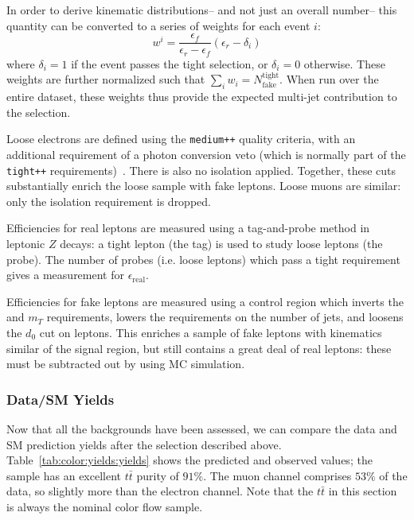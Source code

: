 In order to derive kinematic distributions-- and not just an overall number-- this quantity can be converted to a series of weights for each event $i$:
%
\begin{equation}
w^i = \frac{\epsilon_f}{\epsilon_r - \epsilon_f} (\epsilon_r - \delta_i)
\end{equation}
%
where $\delta_i = 1$ if the event passes the tight selection, or $\delta_i = 0$ otherwise. These weights are further normalized such that $\sum_i w_i = N_\mathrm{fake}^\mathrm{tight}$. When run over the entire dataset, these weights thus provide the expected multi-jet contribution to the selection.

Loose electrons are defined using the \texttt{medium++} quality criteria, with an additional requirement of a photon conversion veto (which is normally part  of the \texttt{tight++} requirements)~\cite{Aad:2014fxa,ATLAS-CONF-2014-032}. There is also no isolation applied. Together, these cuts substantially enrich the loose sample with fake leptons. Loose muons are similar: only the isolation requirement is dropped.  

Efficiencies for real leptons are measured using a tag-and-probe method in leptonic $Z$ decays: a tight lepton (the tag) is used to study loose leptons (the probe). The number of probes (i.e. loose leptons) which pass a tight requirement gives a measurement for $\epsilon_\mathrm{real}$. 

Efficiencies for fake leptons are measured using a control region which inverts the \met and $m_T$ requirements, lowers the requirements on the number of jets, and loosens the $d_0$ cut on leptons. This enriches a sample of fake leptons with kinematics similar of the signal region, but still contains a great deal of real leptons: these must be subtracted out by using MC simulation.

\subsubsection{Data/SM Yields}

Now that all the backgrounds have been assessed, we can compare the data and SM prediction yields after the selection described above. Table~\ref{tab:color:yields:yields} shows the predicted and observed values; the sample has an excellent $t\bar{t}$ purity of $91\%$. The muon channel comprises $53\%$ of the data, so slightly more than the electron channel. Note that the $t\bar{t}$ in this section is always the nominal color flow \PowPythia sample.


